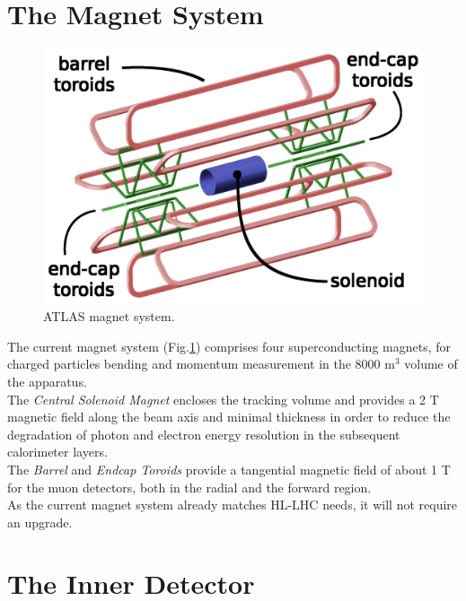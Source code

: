 \documentclass[a4paper,twoside,12pt]{book}
\begin{document}
\section{The Magnet System}\label{sec:magnet}

\begin{figure} [h]
	\centering
	\includegraphics[scale=0.13]{magnetSystems}
	\caption{ATLAS magnet system\cite{magnet_system_picture}.}
	\label{fig:magnet_system_picture}
\end{figure}

The current magnet system (Fig.\ref{fig:magnet_system_picture}) comprises four superconducting magnets\cite{magnet_system}, for charged particles bending and momentum measurement in the $8000$ m$^3$ volume of the apparatus.\\

The \textit{Central Solenoid Magnet} encloses the tracking volume and provides a 2 T magnetic field along the beam axis and minimal thickness in order to reduce the degradation of photon and electron energy resolution in the subsequent calorimeter layers.\\

The \textit{Barrel} and \textit{Endcap Toroids} provide a tangential magnetic field of about 1 T for the muon detectors, both in the radial and the forward region.\\

As the current magnet system already matches HL-LHC needs, it will not require an
upgrade.

\section{The Inner Detector}\label{sec:detector:tracker}
\end{document}
